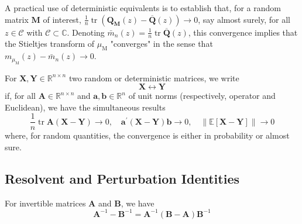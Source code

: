 A practical use of deterministic equivalents is to establish that, for a random matrix $\mathbf{M}$ of interest, $\frac{1}{n} \operatorname{tr}\left(\mathbf{Q}_{\mathbf{M}}(z)-\overline{\mathbf{Q}}(z)\right) \rightarrow 0$, say almost surely, for all $z \in \mathcal{C}$ with $\mathcal{C} \subset \mathbb{C}$. Denoting $\bar{m}_{n}(z)=\frac{1}{n} \operatorname{tr} \overline{\mathbf{Q}}(z)$, this convergence implies that the Stieltjes transform of $\mu_{\mathrm{M}}$ "converges" in the sense that $m_{\mu_{\mathrm{M}}}(z)-\bar{m}_{n}(z) \rightarrow 0$.

\begin{definition}
    For $\mathbf{X},\mathbf{Y}\in\mathbb{R}^{n \times n}$ two random or deterministic matrices, we write
    \begin{equation}
        \mathbf{X}\leftrightarrow\mathbf{Y}
    \end{equation}
    if, for all $\mathbf{A}\in\mathbb{R}^{n\times n}$ and $\mathbf{a},\mathbf{b}\in\mathbb{R}^{n}$ of unit norms (respectively, operator and Euclidean), we have the simultaneous results
    $$
        \frac{1}{n} \operatorname{tr} \mathbf{A}(\mathbf{X}-\mathbf{Y}) \rightarrow 0, \quad \mathbf{a}^{\prime}(\mathbf{X}-\mathbf{Y}) \mathbf{b} \rightarrow 0, \quad\|\mathbb{E}[\mathbf{X}-\mathbf{Y}]\| \rightarrow 0
    $$
    where, for random quantities, the convergence is either in probability or almost sure.
\end{definition}

\subsection*{Resolvent and Perturbation Identities}

\begin{lemma} \label{lem:resolvent-identity}
    For invertible matrices $\mathbf{A}$ and $\mathbf{B}$, we have
    \begin{equation}
        \mathbf{A}^{-1}-\mathbf{B}^{-1}=\mathbf{A}^{-1}\left(\mathbf{B}-\mathbf{A}\right)\mathbf{B}^{-1}
    \end{equation}
\end{lemma}



